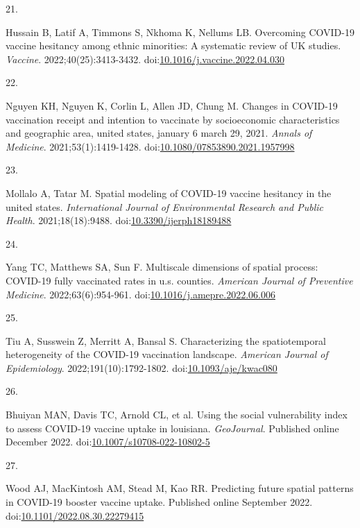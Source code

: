 \documentclass[
  letterpaper,
  DIV=11,
  numbers=noendperiod]{scrartcl}
\newlength{\cslhangindent}
\newlength{\csllabelwidth}
\newlength{\cslentryspacingunit} %
\newenvironment{CSLReferences}[2] %
 {%
  \setlength{\parindent}{0pt}
  \ifodd #1
  \let\oldpar\par
  \def\par{\hangindent=\cslhangindent\oldpar}
  \fi
  \setlength{\parskip}{#2\cslentryspacingunit}
 }%
 {}
\newcommand{\CSLLeftMargin}[1]{\parbox[t]{\csllabelwidth}{#1}}
\newcommand{\CSLRightInline}[1]{\parbox[t]{\linewidth - \csllabelwidth}{#1}\break}
\begin{document}
\begin{CSLReferences}{0}{0}
\leavevmode{}%
\CSLLeftMargin{21. }%
\CSLRightInline{Hussain B, Latif A, Timmons S, Nkhoma K, Nellums LB.
Overcoming {COVID}-19 vaccine hesitancy among ethnic minorities: A
systematic review of {UK} studies. \emph{Vaccine}.
2022;40(25):3413-3432.
doi:\href{https://doi.org/10.1016/j.vaccine.2022.04.030}{10.1016/j.vaccine.2022.04.030}}

\leavevmode{}%
\CSLLeftMargin{22. }%
\CSLRightInline{Nguyen KH, Nguyen K, Corlin L, Allen JD, Chung M.
Changes in {COVID}-19 vaccination receipt and intention to vaccinate by
socioeconomic characteristics and geographic area, united states,
january 6 {\textendash} march 29, 2021. \emph{Annals of Medicine}.
2021;53(1):1419-1428.
doi:\href{https://doi.org/10.1080/07853890.2021.1957998}{10.1080/07853890.2021.1957998}}

\leavevmode{}%
\CSLLeftMargin{23. }%
\CSLRightInline{Mollalo A, Tatar M. Spatial modeling of {COVID}-19
vaccine hesitancy in the united states. \emph{International Journal of
Environmental Research and Public Health}. 2021;18(18):9488.
doi:\href{https://doi.org/10.3390/ijerph18189488}{10.3390/ijerph18189488}}

\leavevmode{}%
\CSLLeftMargin{24. }%
\CSLRightInline{Yang TC, Matthews SA, Sun F. Multiscale dimensions of
spatial process: {COVID}-19 fully vaccinated rates in u.s. counties.
\emph{American Journal of Preventive Medicine}. 2022;63(6):954-961.
doi:\href{https://doi.org/10.1016/j.amepre.2022.06.006}{10.1016/j.amepre.2022.06.006}}

\leavevmode{}%
\CSLLeftMargin{25. }%
\CSLRightInline{Tiu A, Susswein Z, Merritt A, Bansal S. Characterizing
the spatiotemporal heterogeneity of the {COVID}-19 vaccination
landscape. \emph{American Journal of Epidemiology}.
2022;191(10):1792-1802.
doi:\href{https://doi.org/10.1093/aje/kwac080}{10.1093/aje/kwac080}}

\leavevmode{}%
\CSLLeftMargin{26. }%
\CSLRightInline{Bhuiyan MAN, Davis TC, Arnold CL, et al. Using the
social vulnerability index to assess {COVID}-19 vaccine uptake in
louisiana. \emph{{GeoJournal}}. Published online December 2022.
doi:\href{https://doi.org/10.1007/s10708-022-10802-5}{10.1007/s10708-022-10802-5}}

\leavevmode{}%
\CSLLeftMargin{27. }%
\CSLRightInline{Wood AJ, MacKintosh AM, Stead M, Kao RR. Predicting
future spatial patterns in {COVID}-19 booster vaccine uptake. Published
online September 2022.
doi:\href{https://doi.org/10.1101/2022.08.30.22279415}{10.1101/2022.08.30.22279415}}


\end{CSLReferences}
\end{document}
